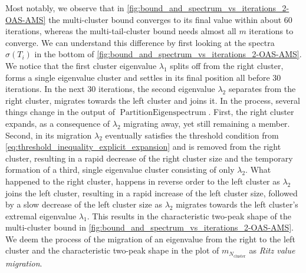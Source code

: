 Most notably, we observe that in \cref{fig:bound_and_spectrum_vs_iterations_2-OAS-AMS} the multi-cluster bound converges to its final value within about 60 iterations, whereas the multi-tail-cluster bound needs almost all $m$ iterations to converge. We can understand this difference by first looking at the spectra $\sigma(T_i)$ in the bottom of \cref{fig:bound_and_spectrum_vs_iterations_2-OAS-AMS}. We notice that the first cluster eigenvalue $\lambda_1$ splits off from the right cluster, forms a single eigenvalue cluster and settles in its final position all before 30 iterations. In the next 30 iterations, the second eigenvalue $\lambda_2$ separates from the right cluster, migrates towards the left cluster and joins it. In the process, several things change in the output of $\operatorname{PartitionEigenspectrum}$. First, the right cluster expands, as a consequence of $\lambda_2$ migrating away, yet still remaining a member. Second, in its migration $\lambda_2$ eventually satisfies the threshold condition from \cref{eq:threshold_inequality_explicit_expansion} and is removed from the right cluster, resulting in a rapid decrease of the right cluster size and the temporary formation of a third, single eigenvalue cluster consisting of only $\lambda_2$. What happened to the right cluster, happens in reverse order to the left cluster as $\lambda_2$ joins the left cluster, resulting in a rapid increase of the left cluster size, followed by a slow decrease of the left cluster size as $\lambda_2$ migrates towards the left cluster's extremal eigenvalue $\lambda_1$. This results in the characteristic two-peak shape of the multi-cluster bound in \cref{fig:bound_and_spectrum_vs_iterations_2-OAS-AMS}. We deem the process of the migration of an eigenvalue from the right to the left cluster and the characteristic two-peak shape in the plot of $m_{N_{\text{cluster}}}$ as \textit{Ritz value migration}.

